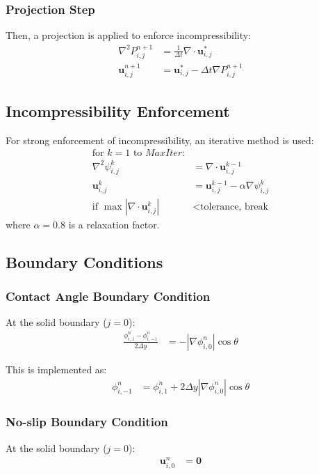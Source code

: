 \documentclass{article}
\begin{document}
\subsubsection{Projection Step}
Then, a projection is applied to enforce incompressibility:
\begin{align}
\nabla^2 P^{n+1}_{i,j} &= \frac{1}{\Delta t}\nabla \cdot \mathbf{u}^*_{i,j} \\
\mathbf{u}^{n+1}_{i,j} &= \mathbf{u}^*_{i,j} - \Delta t \nabla P^{n+1}_{i,j}
\end{align}

\subsection{Incompressibility Enforcement}
For strong enforcement of incompressibility, an iterative method is used:
\begin{align}
\text{for $k = 1$ to $MaxIter$:} \\
\nabla^2 \psi^k_{i,j} &= \nabla \cdot \mathbf{u}^{k-1}_{i,j} \\
\mathbf{u}^{k}_{i,j} &= \mathbf{u}^{k-1}_{i,j} - \alpha \nabla \psi^k_{i,j} \\
\text{if } \max|\nabla \cdot \mathbf{u}^{k}_{i,j}| &< \text{tolerance, break}
\end{align}
where $\alpha = 0.8$ is a relaxation factor.

\subsection{Boundary Conditions}
\subsubsection{Contact Angle Boundary Condition}
At the solid boundary ($j=0$):
\begin{align}
\frac{\phi^n_{i,1} - \phi^n_{i,-1}}{2\Delta y} &= -|\nabla\phi^n_{i,0}|\cos\theta
\end{align}

This is implemented as:
\begin{align}
\phi^n_{i,-1} &= \phi^n_{i,1} + 2\Delta y|\nabla\phi^n_{i,0}|\cos\theta
\end{align}

\subsubsection{No-slip Boundary Condition}
At the solid boundary ($j=0$):
\begin{align}
\mathbf{u}^n_{i,0} &= \mathbf{0}
\end{align}
\end{document}
